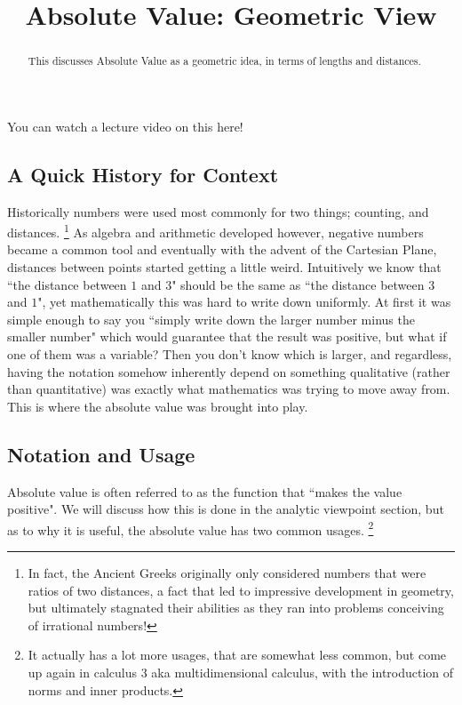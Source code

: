 \documentclass{ximera}
\title{Absolute Value: Geometric View}
\begin{document}
\begin{abstract}
    This discusses Absolute Value as a geometric idea, in terms of lengths and distances.
\end{abstract}
\maketitle

You can watch a lecture video on this here!


\subsection*{A Quick History for Context}
    Historically numbers were used most commonly for two things; counting, and distances.%
    \footnote{In fact, the Ancient Greeks originally only considered numbers that were ratios of two distances, a fact that led to impressive development in geometry, but ultimately stagnated their abilities as they ran into problems conceiving of irrational numbers!}
    As algebra and arithmetic developed however, negative numbers became a common tool and eventually with the advent of the Cartesian Plane, distances between points started getting a little weird. Intuitively we know that ``the distance between $1$ and $3$" should be the same as ``the distance between $3$ and $1$", yet mathematically this was hard to write down uniformly. At first it was simple enough to say you ``simply write down the larger number minus the smaller number" which would guarantee that the result was positive, but what if one of them was a variable? Then you don't know which is larger, and regardless, having the notation somehow inherently depend on something qualitative (rather than quantitative) was exactly what mathematics was trying to move away from. This is where the absolute value was brought into play.

\subsection*{Notation and Usage}
    Absolute value is often referred to as the function that ``makes the value positive". We will discuss how this is done in the analytic viewpoint section, but as to why it is useful, the absolute value has two common usages.%
    \footnote{It actually has a lot more usages, that are somewhat less common, but come up again in calculus 3 aka multidimensional calculus, with the introduction of norms and inner products.}
    
\end{document}

